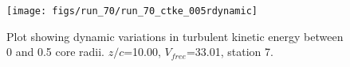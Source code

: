 \begin{figure}[H]
\centering
\texttt{[image: figs/run\_70/run\_70\_ctke\_005rdynamic]}
\caption{Plot showing dynamic variations in turbulent kinetic energy between 0 and 0.5 core radii. $z/c$=10.00, $V_{free}$=33.01, station 7.}
\label{fig:run_70_ctke_005rdynamic}
\end{figure}


